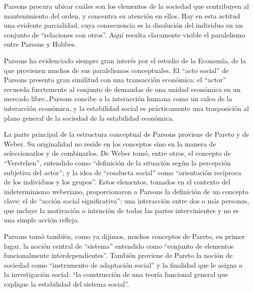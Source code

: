 \documentclass[
]{book}
\begin{document}
Parsons procura ubicar cuáles son los elementos de la sociedad que contribuyen al mantenimiento del orden, y concentra su atención en ellos. Hay en esta actitud una evidente parcialidad, cuya consecuencia es la disolución del individuo en un conjunto de ``relaciones con otros''. Aquí resulta claramente visible el paralelismo entre Parsons y Hobbes.

Parsons ha evidenciado siempre gran interés por el estudio de la Economía, de la que provienen muchos de sus paralelismos conceptuales. El ``acto social'' de Parsons presenta gran similitud con una transacción económica: el ``actor'' recuerda fuertemente al conjunto de demandas de una unidad económica en un mercado libre\ldots Parsons concibe a la interacción humana como un calco de la interacción económica, y la estabilidad social es prácticamente una trasposición al plano general de la sociedad de la estabilidad económica.

La parte principal de la estructura conceptual de Parsons proviene de Pareto y de Weber. Su originalidad no reside en los conceptos sino en la manera de seleccionarlos y de combinarlos. De Weber tomó, entre otros, el concepto de ``Verstehen'', entendido como ``definición de la situación según la percepción subjetiva del actor''; y la idea de ``conducta social'' como ``orientación recíproca de los individuos y los grupos''. Estos elementos, tomados en el contexto del indeterminismo weberiano, proporcionaron a Parsons la definición de un concepto clave: el de ``acción social significativa'': una interacción entre dos o más personas, que incluye la motivación o intención de todas las partes intervinientes y no es una simple acción refleja.

Parsons tomó también, como ya dijimos, muchos conceptos de Pareto, en primer lugar, la noción central de ``sistema'' entendido como ``conjunto de elementos funcionalmente interdependientes''. También proviene de Pareto la noción de sociedad como ``instrumento de adaptación social'' y la finalidad que le asigna a la investigación social: ``la construcción de una teoría funcional general que explique la estabilidad del sistema social''.
\end{document}
